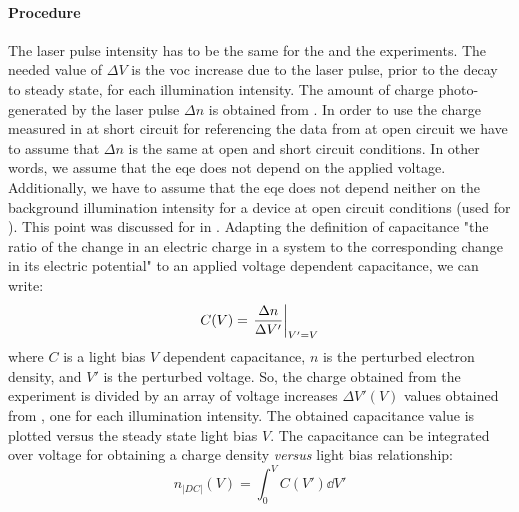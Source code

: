 	\paragraph{Procedure}
	The laser pulse intensity has to be the same for the  and the  experiments.
	The needed value of $\Delta V$ is the \gls{voc} increase due to the laser pulse, prior to the decay to steady state, for each illumination intensity.
	The amount of charge photo\hyp{}generated by the laser pulse $\Delta n$ is obtained from .
	In order to use the charge measured in  at short circuit for referencing the data from  at open circuit we have to assume that $\Delta n$ is the same at open and short circuit conditions.
	In other words, we assume that the \gls{eqe} does not depend on the applied voltage.
	Additionally, we have to assume that the \gls{eqe} does not depend neither on the background illumination intensity for a device at open circuit conditions (used for ).
	This point was discussed for  in .
	Adapting the definition of capacitance "the ratio of the change in an electric charge in a system to the corresponding change in its electric potential" \cite{WikipediaCapacitance2019} to an applied voltage dependent capacitance, we can write:
	\begin{equation}\label{eq:dc}
		C(V) = \eval{\frac{\Delta n}{\Delta V'}}_{V'=V}
	\end{equation}
	where $C$ is a light bias $V$ dependent capacitance, $n$ is the perturbed electron density, and $V'$ is the perturbed voltage.
	So, the charge obtained from the  experiment is divided by an array of voltage increases $\Delta V'(V)$ values obtained from , one for each illumination intensity.
	The obtained capacitance value is plotted versus the steady state light bias $V$.
	The capacitance can be integrated over voltage for obtaining a charge density \textsl{versus} light bias relationship:
		\begin{equation}\label{eq:dc_charge}
	n_|DC|(V) = \int_{0}^{V} C(V') \dd V'
	\end{equation}
